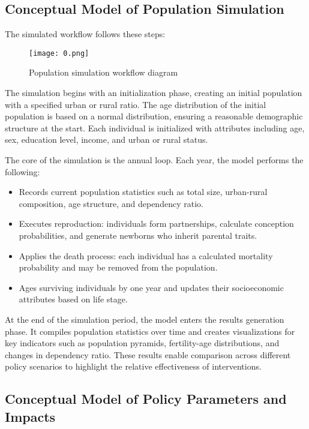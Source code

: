\documentclass[12pt]{article}
\begin{document}
\subsection{Conceptual Model of Population Simulation}

The simulated workflow follows these steps:

\begin{figure}[H]
    \centering
    \texttt{[image: 0.png]}
    \caption{Population simulation workflow diagram}
    \label{fig:workflow}
\end{figure}


The simulation begins with an initialization phase, creating an initial population with a specified urban or rural ratio. The age distribution of the initial population is based on a normal distribution, ensuring a reasonable demographic structure at the start. Each individual is initialized with attributes including age, sex, education level, income, and urban or rural status.

The core of the simulation is the annual loop. Each year, the model performs the following:

\begin{itemize}
    \item Records current population statistics such as total size, urban-rural composition, age structure, and dependency ratio.
    \item Executes reproduction: individuals form partnerships, calculate conception probabilities, and generate newborns who inherit parental traits.
    \item Applies the death process: each individual has a calculated mortality probability and may be removed from the population.
    \item Ages surviving individuals by one year and updates their socioeconomic attributes based on life stage.
\end{itemize}

At the end of the simulation period, the model enters the results generation phase. It compiles population statistics over time and creates visualizations for key indicators such as population pyramids, fertility-age distributions, and changes in dependency ratio. These results enable comparison across different policy scenarios to highlight the relative effectiveness of interventions.

\subsection{Conceptual Model of Policy Parameters and Impacts}
\end{document}
